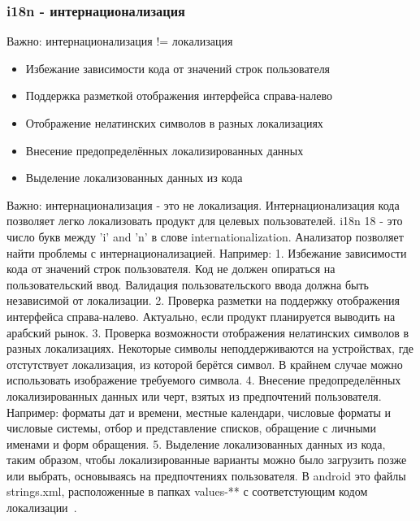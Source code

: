 \documentclass{../industrial-development}
\begin{document}
\begin{frame} \frametitle{i18n - интернационализация}
	\begin{block}{}
		\alert{Важно}: интернационализация != локализация
	\end{block}
	\begin{itemize}
		\item Избежание зависимости кода от значений строк пользователя
		\item Поддержка разметкой отображения интерфейса справа-налево
		\item Отображение нелатинских символов в разных локализациях
		\item Внесение предопределённых локализированных данных
		\item Выделение локализованных данных из кода
	\end{itemize}
\end{frame}
\lecturenotes
Важно: интернационализация - это не локализация.
Интернационализация кода позволяет легко локализовать продукт для целевых пользователей. i18n 18 - это число букв между 'i' and 'n' в слове internationalization.
Анализатор позволяет найти проблемы с интернационализацией. Например:
1. Избежание зависимости кода от значений строк пользователя.
Код не должен опираться на пользовательский ввод. Валидация пользовательского ввода должна быть независимой от локализации.
2. Проверка разметки на поддержку отображения интерфейса справа-налево.
Актуально, если продукт планируется выводить на арабский рынок.
3. Проверка возможности отображения нелатинских символов в разных локализациях.
Некоторые символы неподдерживаются на устройствах, где отстутствует локализация, из которой берётся символ. В крайнем случае можно использовать изображение требуемого символа.
4. Внесение предопределённых локализированных данных или черт, взятых из предпочтений пользователя. Например: форматы дат и времени, местные календари, числовые форматы и числовые системы, отбор и представление списков, обращение с личными именами и форм обращения.
5. Выделение локализованных данных из кода, таким образом, чтобы локализированные варианты можно было загрузить позже или выбрать, основываясь на предпочтениях пользователя. В android это файлы strings.xml, расположенные в папках values-** с соответстующим кодом локализации~\cite{i18n}.
\end{document}

